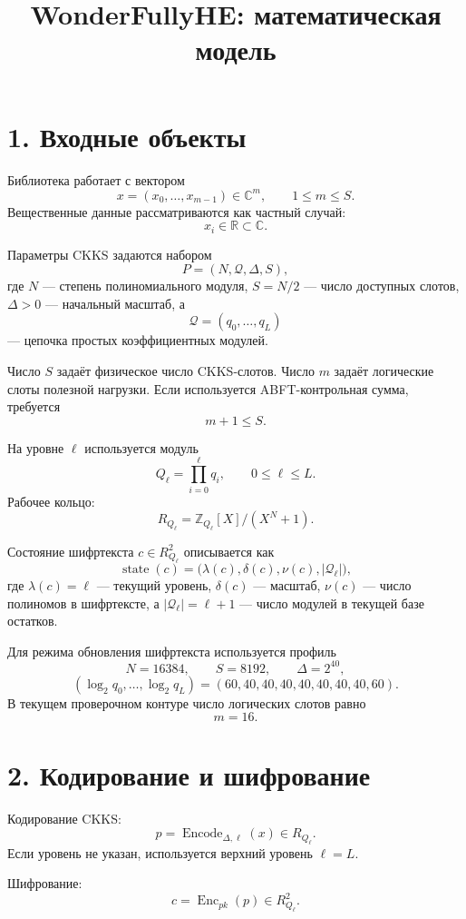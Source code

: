 \documentclass[12pt]{article}
\title{WonderFullyHE: математическая модель}
\date{}
\newcommand{\Enc}{\operatorname{Enc}}
\newcommand{\Encode}{\operatorname{Encode}}
\newcommand{\lvl}{\lambda}
\newcommand{\scl}{\delta}
\newcommand{\sz}{\nu}
\begin{document}
\maketitle

\section*{1. Входные объекты}

Библиотека работает с вектором
\[
    x=(x_0,\ldots,x_{m-1})\in\mathbb{C}^{m},
    \qquad
    1\leq m\leq S.
\]
Вещественные данные рассматриваются как частный случай:
\[
    x_i\in\mathbb{R}\subset\mathbb{C}.
\]

Параметры CKKS задаются набором
\[
    P=(N,\mathcal{Q},\Delta,S),
\]
где \(N\) --- степень полиномиального модуля, \(S=N/2\) --- число
доступных слотов, \(\Delta>0\) --- начальный масштаб, а
\[
    \mathcal{Q}=(q_0,\ldots,q_L)
\]
--- цепочка простых коэффициентных модулей.

Число \(S\) задаёт физическое число CKKS-слотов. Число \(m\) задаёт
логические слоты полезной нагрузки. Если используется ABFT-контрольная
сумма, требуется
\[
    m+1\leq S.
\]

На уровне \(\ell\) используется модуль
\[
    Q_\ell=\prod_{i=0}^{\ell}q_i,
    \qquad
    0\leq \ell\leq L.
\]
Рабочее кольцо:
\[
    R_{Q_\ell}=\mathbb{Z}_{Q_\ell}[X]/(X^N+1).
\]

Состояние шифртекста \(c\in R_{Q_\ell}^{2}\) описывается как
\[
    \operatorname{state}(c)=
    \bigl(\lvl(c),\scl(c),\sz(c),|\mathcal{Q}_{\ell}|\bigr),
\]
где \(\lvl(c)=\ell\) --- текущий уровень, \(\scl(c)\) --- масштаб,
\(\sz(c)\) --- число полиномов в шифртексте, а
\(|\mathcal{Q}_{\ell}|=\ell+1\) --- число модулей в текущей базе остатков.

Для режима обновления шифртекста используется профиль
\[
    N=16384,\qquad S=8192,\qquad \Delta=2^{40},
\]
\[
    (\log_2 q_0,\ldots,\log_2 q_L)
    =
    (60,40,40,40,40,40,40,40,60).
\]
В текущем проверочном контуре число логических слотов равно
\[
    m=16.
\]

\section*{2. Кодирование и шифрование}

Кодирование CKKS:
\[
    p=\Encode_{\Delta,\ell}(x)\in R_{Q_\ell}.
\]
Если уровень не указан, используется верхний уровень \(\ell=L\).

Шифрование:
\[
    c=\Enc_{pk}(p)\in R_{Q_\ell}^{2}.
\]
\end{document}
